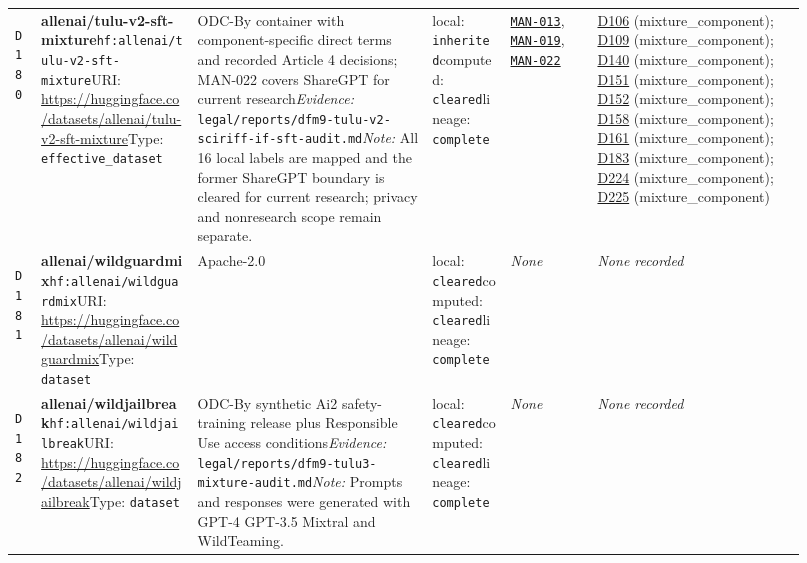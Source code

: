 \documentclass[9pt,a4paper]{article}
\newcommand{\depid}[1]{\hypertarget{dep:#1}{\texttt{#1}}}
\begin{document}
\begin{landscape}
\begin{longtable}{@{}L{0.035\linewidth}L{0.185\linewidth}L{0.27\linewidth}L{0.09\linewidth}L{0.10\linewidth}L{0.24\linewidth}@{}}
\depid{D180} & \textbf{allenai/tulu-v2-sft-mixture}\newline \nolinkurl{hf:allenai/tulu-v2-sft-mixture}\newline URI: \url{https://huggingface.co/datasets/allenai/tulu-v2-sft-mixture}\newline Type: \texttt{effective\_dataset} & ODC-By container with component-specific direct terms and recorded Article 4 decisions; MAN-022 covers ShareGPT for current research\newline \textit{Evidence:} \nolinkurl{legal/reports/dfm9-tulu-v2-sciriff-if-sft-audit.md}\newline \textit{Note:} All 16 local labels are mapped and the former ShareGPT boundary is cleared for current research; privacy and nonresearch scope remain separate. & local: \texttt{inherited}\newline computed: \texttt{cleared}\newline lineage: \texttt{complete} & \hyperlink{manual:MAN-013}{\texttt{MAN-013}}, \hyperlink{manual:MAN-019}{\texttt{MAN-019}}, \hyperlink{manual:MAN-022}{\texttt{MAN-022}} & \hyperlink{dep:D106}{D106} (mixture\_component); \hyperlink{dep:D109}{D109} (mixture\_component); \hyperlink{dep:D140}{D140} (mixture\_component); \hyperlink{dep:D151}{D151} (mixture\_component); \hyperlink{dep:D152}{D152} (mixture\_component); \hyperlink{dep:D158}{D158} (mixture\_component); \hyperlink{dep:D161}{D161} (mixture\_component); \hyperlink{dep:D183}{D183} (mixture\_component); \hyperlink{dep:D224}{D224} (mixture\_component); \hyperlink{dep:D225}{D225} (mixture\_component) \\
\depid{D181} & \textbf{allenai/wildguardmix}\newline \nolinkurl{hf:allenai/wildguardmix}\newline URI: \url{https://huggingface.co/datasets/allenai/wildguardmix}\newline Type: \texttt{dataset} & Apache-2.0 & local: \texttt{cleared}\newline computed: \texttt{cleared}\newline lineage: \texttt{complete} & \textit{None} & \textit{None recorded} \\
\depid{D182} & \textbf{allenai/wildjailbreak}\newline \nolinkurl{hf:allenai/wildjailbreak}\newline URI: \url{https://huggingface.co/datasets/allenai/wildjailbreak}\newline Type: \texttt{dataset} & ODC-By synthetic Ai2 safety-training release plus Responsible Use access conditions\newline \textit{Evidence:} \nolinkurl{legal/reports/dfm9-tulu3-mixture-audit.md}\newline \textit{Note:} Prompts and responses were generated with GPT-4 GPT-3.5 Mixtral and WildTeaming. & local: \texttt{cleared}\newline computed: \texttt{cleared}\newline lineage: \texttt{complete} & \textit{None} & \textit{None recorded} \\

\end{longtable}
\end{landscape}
\end{document}
